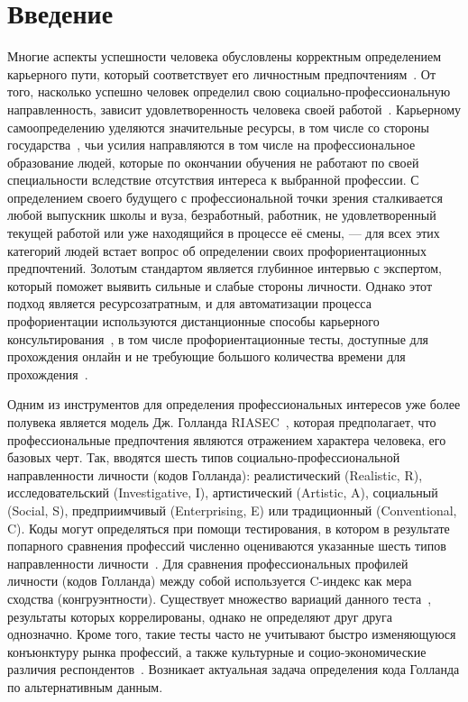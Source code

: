 

\section*{Введение}

Многие аспекты успешности человека обусловлены корректным определением карьерного пути, который соответствует его личностным предпочтениям~\cite{Presti}. От того, насколько успешно человек определил свою социально-профессиональную направленность, зависит удовлетворенность человека своей работой~\cite{Aydıntan, Cannas, Medgyesi}. Карьерному самоопределению уделяются значительные ресурсы, в том числе со стороны государства~\cite{FZ489}, чьи усилия направляются в том числе на профессиональное образование людей, которые по окончании обучения не работают по своей специальности вследствие отсутствия интереса к выбранной профессии. С определением своего будущего с профессиональной точки зрения сталкивается любой выпускник школы и вуза, безработный, работник, не удовлетворенный текущей работой или уже находящийся в процессе её смены, — для всех этих категорий людей встает вопрос об определении своих профориентационных предпочтений. Золотым стандартом является глубинное интервью с экспертом, который поможет выявить сильные и слабые стороны личности. Однако этот подход является ресурсозатратным, и для автоматизации процесса профориентации используются дистанционные способы карьерного консультирования~\cite{Pordelan, Westman}, в том числе профориентационные тесты, доступные для прохождения онлайн и не требующие большого количества времени для прохождения~\cite{vk_psychotests}.

Одним из инструментов для определения профессиональных интересов уже более полувека является модель Дж. Голланда RIASEC~\cite{Holland1959}, которая предполагает, что профессиональные предпочтения являются отражением характера человека, его базовых черт. Так, вводятся шесть типов социально-профессиональной направленности личности (кодов Голланда): реалистический (Realistic, R), исследовательский (Investigative, I), артистический (Artistic, A), социальный (Social, S), предприимчивый (Enterprising, E) или традиционный (Conventional, C). Коды могут определяться при помощи тестирования, в котором в результате попарного сравнения профессий численно оцениваются указанные шесть типов направленности личности~\cite{Rezapkina}. Для сравнения профессиональных профилей личности (кодов Голланда) между собой используется C-индекс как мера сходства (конгруэнтности). Существует множество вариаций данного теста~\cite{Chu}, результаты которых коррелированы, однако не определяют друг друга однозначно. Кроме того, такие тесты часто не учитывают быстро изменяющуюся конъюнктуру рынка профессий, а также культурные и социо-экономические различия респондентов~\cite{Chu, Hoff, Nye}. Возникает актуальная задача определения кода Голланда по альтернативным данным.

